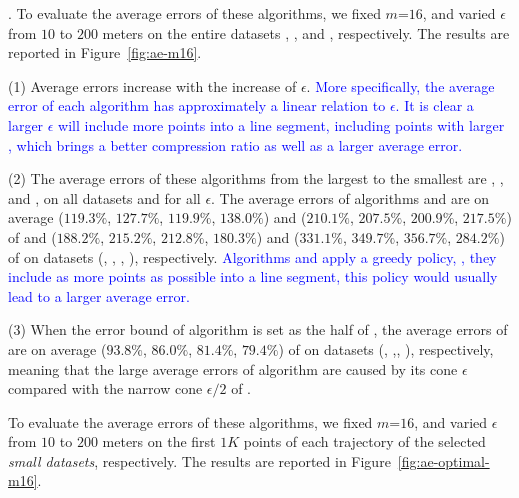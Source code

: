 {%
.
To evaluate the average errors of these algorithms, we fixed {$m$=$16$}, and
varied $\epsilon$ from $10$ to $200$ meters on the entire
{datasets} \sercar, \geolife, \mopsi and \pricar, respectively.
The results are reported in Figure~\ref{fig:ae-m16}.

\ni(1) Average errors increase with the increase of $\epsilon$.
\textcolor{blue}{More specifically, the average error of each algorithm has approximately a linear relation to $\epsilon$.}
\textcolor{blue}{It is clear a larger $\epsilon$ will include more points into a line segment, including points with larger \sed, which brings a better compression ratio as well as a larger average error.}

\ni(2) The average errors of these algorithms from the largest to the smallest are \cista, \cist, \dps and \squishe, on all datasets and for all $\epsilon$.
The average errors of algorithms \cist and \cista are on average
($119.3\%$, $127.7\%$, $119.9\%$, $138.0\%$)
and ($210.1\%$, $207.5\%$, $200.9\%$, $217.5\%$)
of \dps and ($188.2\%$, $215.2\%$, $212.8\%$, $180.3\%$) and
($331.1\%$, $349.7\%$, $356.7\%$, $284.2\%$)
 of \squishe on datasets (\sercar, \geolife, \mopsi, \pricar), respectively.
\textcolor{blue}{Algorithms \cista and \cist apply a greedy policy, \ie, they include as more points as possible into a line segment, this policy would usually lead to a larger average error.}

\ni(3) When the error bound of algorithm \cista is set as the half of \cist, the
average errors of \cista are on average ($93.8\%$, $86.0\%$, $81.4\%$, {$79.4\%$}) of \cist on {datasets} (\sercar, \geolife,\mopsi, \pricar), respectively, meaning that the large average errors of algorithm \cista are caused by its cone \wrt $\epsilon$ compared with the narrow cone \wrt $\epsilon/2$ of \cist.

To evaluate the average errors of these algorithms, we fixed {$m$=$16$}, and
varied $\epsilon$ from $10$ to $200$ meters on the first $1K$ points of each trajectory of the selected \textit{small datasets}, respectively.
The results are reported in Figure~\ref{fig:ae-optimal-m16}.

}
